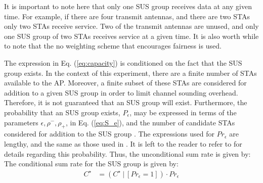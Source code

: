 It is important to note here that only one SUS group receives data at any given time. For example, if there are four transmit antennas, and there are two STAs only two STAs receive service. Two of the transmit antennas are unused, and only one SUS group of two STAs receives service at a given time. It is also worth while to note that the no weighting scheme that encourages fairness is used.

The expression in Eq. (\ref{eq:capacity}) is conditioned on the fact that the SUS group exists. In the context of this experiment, there are a finite number of STAs available to the AP. Moreover, a finite subset of these STAs are considered for addition to a given SUS group in order to limit channel sounding overhead. Therefore, it is not guaranteed that an SUS group will exist. Furthermore, the probability that an SUS group exists, $P_{\epsilon}$, may be expressed in terms of the parameters $\epsilon,\rho^-,\rho_+$, in Eq. (\ref{eq:S_e}), and the number of candidate STAs considered for addition to the SUS group \cite{Swannack2005}. The expressions used for $Pr_\epsilon$ are lengthy, and the same as those used in \cite{Swannack2005}. It is left to the reader to refer to \cite{Swannack2005} for details regarding this probability. Thus, the unconditional sum rate is given by:
The conditional sum rate for the SUS group is given by:
\begin{equation}\label{eq:sum_rate}
    \begin{aligned}
        C^{\star} &=  (C^{\star} \ \vert \ [Pr_\epsilon = 1])\cdot Pr_\epsilon
    \end{aligned}
\end{equation}






